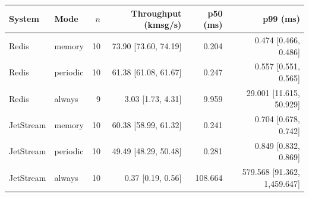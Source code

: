 \begin{tabular}{llrrrr}
\toprule
System & Mode & $n$ & Throughput (kmsg/s) & p50 (ms) & p99 (ms)\\
\midrule
Redis & memory & 10 & 73.90 [73.60, 74.19] & 0.204 & 0.474 [0.466, 0.486]\\
Redis & periodic & 10 & 61.38 [61.08, 61.67] & 0.247 & 0.557 [0.551, 0.565]\\
Redis & always & 9 & 3.03 [1.73, 4.31] & 9.959 & 29.001 [11.615, 50.929]\\
JetStream & memory & 10 & 60.38 [58.99, 61.32] & 0.241 & 0.704 [0.678, 0.742]\\
JetStream & periodic & 10 & 49.49 [48.29, 50.48] & 0.281 & 0.849 [0.832, 0.869]\\
JetStream & always & 10 & 0.37 [0.19, 0.56] & 108.664 & 579.568 [91.362, 1,459.647]\\
\bottomrule
\end{tabular}
